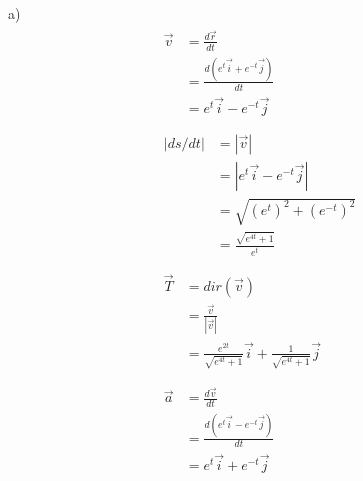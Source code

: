 \documentclass{article}
\begin{document}
a) 
\begin{gather*}
  \begin{split}
    \vec{v} &= \frac{d\vec{r}}{dt} \\
            &= \frac{d(e^t \vec{i} + e^{-t} \vec{j})}{dt} \\
            &= e^t \vec{i} - e^{-t} \vec{j} \\
  \end{split} \\
  \begin{split}
    |ds/dt| &= |\vec{v}| \\
            &= |e^t \vec{i} - e^{-t} \vec{j}| \\
            &= \sqrt{(e^t)^2 + (e^{-t})^2} \\
            &= \frac{\sqrt{e^{4t} + 1}}{e^t} \\
  \end{split} \\
  \begin{split}
    \vec{T} &= dir(\vec{v}) \\
            &= \frac{\vec{v}}{|\vec{v}|} \\
            &= \frac{e^{2t}}{\sqrt{e^{4t} + 1}} \vec{i} + \frac{1}{\sqrt{e^{4t} + 1}} \vec{j} \\
  \end{split} \\
  \begin{split}
    \vec{a} &= \frac{d\vec{v}}{dt} \\
            &= \frac{d(e^t \vec{i} - e^{-t} \vec{j})}{dt} \\
            &= e^t \vec{i} + e^{-t} \vec{j} \\
  \end{split} \\
\end{gather*}
\end{document}
